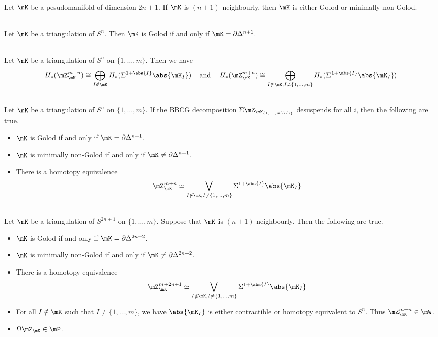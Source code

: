 \documentclass[a4paper]{article}
\begin{document}
\begin{crl}{}{}\\
Let $\mK$ be a pesudomanifold of dimension $2n+1$. If $\mK$ is $(n+1)$-neighbourly, then $\mK$ is either Golod or minimally non-Golod. 
\end{crl}

\begin{crl}{}{}\\
Let $\mK$ be a triangulation of $S^n$. Then $\mK$ is Golod if and only if $\mK=\partial\Delta^{n+1}$. 
\end{crl}

\begin{thm}{}{}\\
Let $\mK$ be a triangulation of $S^n$ on $\{1,\dots,m\}$. Then we have $$H_\ast(\mZ_\mK^{m+n})\cong\bigoplus_{I\notin\mK}H_\ast(\Sigma^{1+\abs{I}}\abs{\mK_I})\;\;\;\text{ and }\;\;\;H_\ast(\mZ_\mK^{m+n})\cong\bigoplus_{I\notin\mK,I\neq\{1,\dots,m\}}H_\ast(\Sigma^{1+\abs{I}}\abs{\mK_I})$$
\end{thm}

\begin{thm}{}{}\\
Let $\mK$ be a triangulation of $S^n$ on $\{1,\dots,m\}$. If the BBCG decomposition $\Sigma\mZ_{\mK_{\{1,\dots,m\}\setminus\{i\}}}$ desuspends for all $i$, then the following are true. 
\begin{itemize}
\item $\mK$ is Golod if and only if $\mK=\partial\Delta^{n+1}$. 
\item $\mK$ is minimally non-Golod if and only if $\mK\neq\partial\Delta^{n+1}$. 
\item There is a homotopy equivalence $$\mZ_\mK^{m+n}\simeq\bigvee_{I\notin\mK,I\neq\{1,\dots,m\}}\Sigma^{1+\abs{I}}\abs{\mK_I}$$
\end{itemize}
\end{thm}

\begin{crl}{}{}\\
Let $\mK$ be a triangulation of $S^{2n+1}$ on $\{1,\dots,m\}$. Suppose that $\mK$ is $(n+1)$-neighbourly. Then the following are true. 
\begin{itemize}
\item $\mK$ is Golod if and only if $\mK=\partial\Delta^{2n+2}$. 
\item $\mK$ is minimally non-Golod if and only if $\mK\neq\partial\Delta^{2n+2}$. 
\item There is a homotopy equivalence $$\mZ_\mK^{m+2n+1}\simeq\bigvee_{I\notin\mK,I\neq\{1,\dots,m\}}\Sigma^{1+\abs{I}}\abs{\mK_I}$$
\item For all $I\notin\mK$ such that $I\neq\{1,\dots,m\}$, we have $\abs{\mK_I}$ is either contractible or homotopy equivalent to $S^n$. Thus $\mZ_\mK^{m+n}\in\mW$. 
\item $\Omega\mZ_\mK\in\mP$. 
\end{itemize}
\end{crl}
\end{document}
